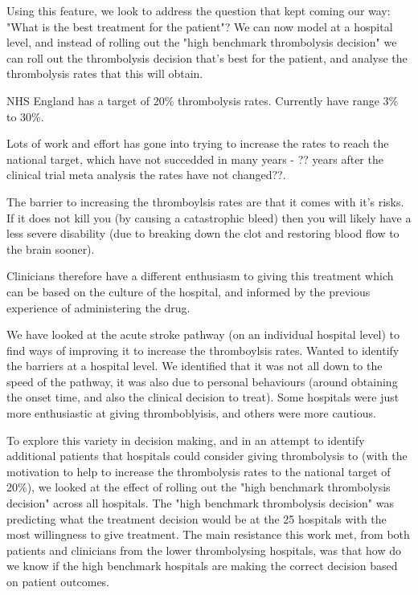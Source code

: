 Using this feature, we look to address the question that kept coming our way: "What is the best treatment for the patient"? We can now model at a hospital level, and instead of rolling out the "high benchmark thrombolysis decision" we can roll out the thrombolysis decision that's best for the patient, and analyse the thrombolysis rates that this will obtain.

NHS England has a target of 20\% thrombolysis rates. Currently have range 3\% to 30\%.

Lots of work and effort has gone into trying to increase the rates to reach the national target, which have not succedded in many years - ?? years after the clinical trial meta analysis the rates have not changed??.

The barrier to increasing the thromboylsis rates are that it comes with it's risks. If it does not kill you (by causing a catastrophic bleed) then you will likely have a less severe disability (due to breaking down the clot and restoring blood flow to the brain sooner).

Clinicians therefore have a different enthusiasm to giving this treatment which can be based on the culture of the hospital, and informed by the previous experience of administering the drug.

We have looked at the acute stroke pathway (on an individual hospital level) to find ways of improving it to increase the thromboylsis rates. Wanted to identify the barriers at a hospital level. We identified that it was not all down to the speed of the pathway, it was also due to personal behaviours (around obtaining the onset time, and also the clinical decision to treat). Some hospitals were just more enthusiastic at giving thromboblyisis, and others were more cautious.

To explore this variety in decision making, and in an attempt to identify additional patients that hospitals could consider giving thrombolysis to (with the motivation to help to increase the thrombolysis rates to the national target of 20\%), we looked at the effect of rolling out the "high benchmark thrombolysis decision" across all hospitals. The "high benchmark thrombolysis decision" was predicting what the treatment decision would be at the 25 hospitals with the most willingness to give treatment. The main resistance this work met, from both patients and clinicians from the lower thrombolysing hospitals, was that how do we know if the high benchmark hospitals are making the correct decision based on patient outcomes.

